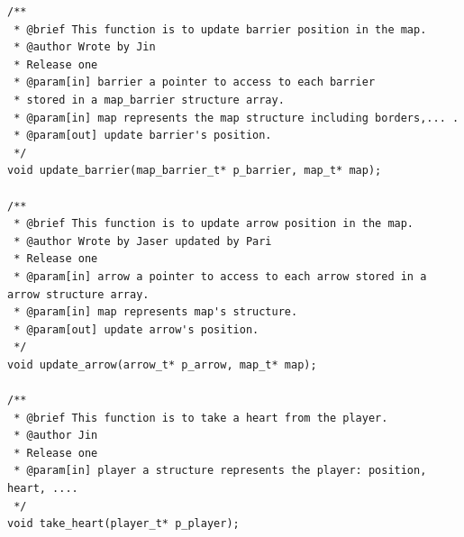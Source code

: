 \begin{verbatim}
/**
 * @brief This function is to update barrier position in the map.
 * @author Wrote by Jin
 * Release one
 * @param[in] barrier a pointer to access to each barrier
 * stored in a map_barrier structure array.
 * @param[in] map represents the map structure including borders,... .
 * @param[out] update barrier's position.
 */
void update_barrier(map_barrier_t* p_barrier, map_t* map);

/**
 * @brief This function is to update arrow position in the map.
 * @author Wrote by Jaser updated by Pari
 * Release one
 * @param[in] arrow a pointer to access to each arrow stored in a arrow structure array.
 * @param[in] map represents map's structure.
 * @param[out] update arrow's position.
 */
void update_arrow(arrow_t* p_arrow, map_t* map);

/**
 * @brief This function is to take a heart from the player.
 * @author Jin
 * Release one
 * @param[in] player a structure represents the player: position, heart, ....
 */
void take_heart(player_t* p_player);
\end{verbatim}